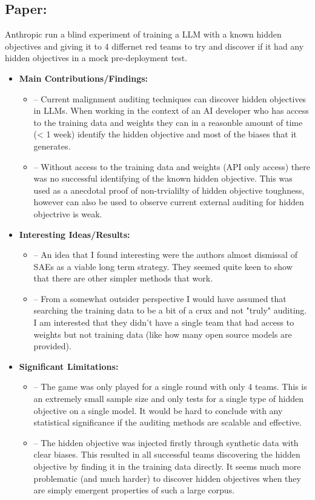 \documentclass{article}[11pt]
\newcommand{\paperdetails}[5]{
\subsection*{Paper: \fullcite{#1}}
#2
\begin{itemize}
    \item \textbf{Main Contributions/Findings:}
    \begin{itemize}
        #3
    \end{itemize}
    \item \textbf{Interesting Ideas/Results:}
    \begin{itemize}
        #4
    \end{itemize}
    \item \textbf{Significant Limitations:}
    \begin{itemize}
        #5
    \end{itemize}
\end{itemize}
}
\begin{document}
\begin{mdframed}[]
\paperdetails{marksAuditingLanguageModels2025}{
    Anthropic run a blind experiment of training a LLM with a known hidden objectives and giving it to 4 differnet red teams to try and discover if it had any hidden objectives in a mock pre-deployment test.
}{
    \item [--] Current malignment auditing techniques can discover hidden objectives in LLMs. When working in the context of an AI developer who has access to the training data and weights they can in a reasonble amount of time (< 1 week) identify the hidden objective and most of the biases that it generates.
    \item [--] Without access to the training data and weights (API only access) there was no successful identifying of the known hidden objective. This was used as a anecdotal proof of non-trvialilty of hidden objective toughness, however can also be used to observe current external auditing for hidden objectrive is weak.
}{
    \item [--] An idea that I found interesting were the authors almost dismissal of SAEs as a viable long term strategy. They seemed quite keen to show that there are other simpler methods that work.
    \item [--] From a somewhat outsider perspective I would have assumed that searching the training data to be a bit of a crux and not "truly" auditing. I am interested that they didn't have a single team that had access to weights but not training data (like how many open source models are provided).
}{
    \item [--] The game was only played for a single round with only 4 teams. This is an extremely small sample size and only tests for a single type of hidden objective on a single model. It would be hard to conclude with any statistical significance if the auditing methods are scalable and effective.
    \item [--] The hidden objective was injected firstly through synthetic data with clear biases. This resulted in all successful teams discovering the hidden objective by finding it in the training data directly. It seems much more problematic (and much harder) to discover hidden objectives when they are simply emergent properties of such a large corpus.
}


\end{mdframed}
\end{document}
